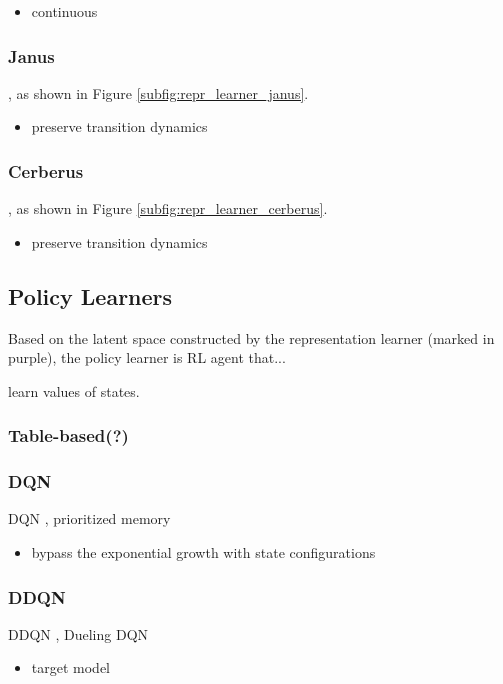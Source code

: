\begin{itemize}
	\item continuous
\end{itemize}

\subsubsection{Janus}
, as shown in Figure \ref{subfig:repr_learner_janus}.
\begin{itemize}
	\item preserve transition dynamics
\end{itemize}

\subsubsection{Cerberus}
, as shown in Figure \ref{subfig:repr_learner_cerberus}.

\begin{itemize}
	\item preserve transition dynamics
\end{itemize}

\subsection{Policy Learners}
Based on the latent space constructed by the representation learner (marked in purple), the policy learner is RL agent that...

learn values of states.

\subsubsection{Table-based(?)}

\subsubsection{DQN}
DQN \citep{DQN}, prioritized memory \citep{prioritized_memory}
\begin{itemize}
	\item bypass the exponential growth with state configurations
\end{itemize}

\subsubsection{DDQN}
DDQN \citep{DDQN}, Dueling DQN \citep{DuelingDQN}

\begin{itemize}
	\item target model
\end{itemize}